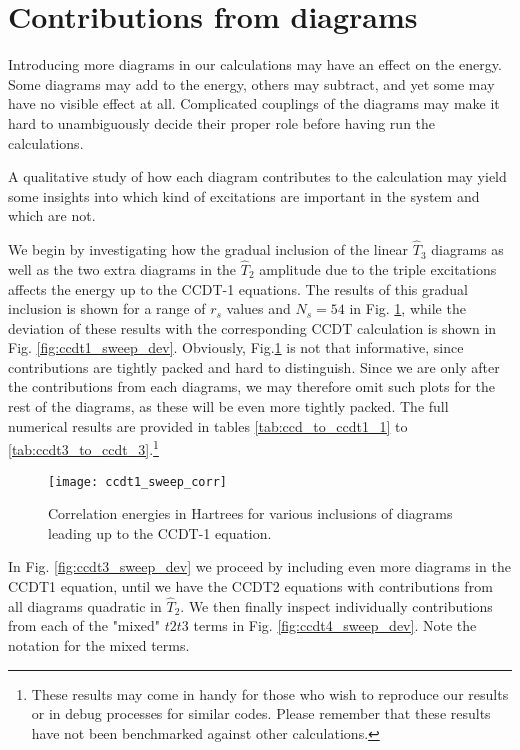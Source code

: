 \FloatBarrier
\section{Contributions from diagrams}

Introducing more diagrams in our calculations may have an effect on
the energy. Some diagrams may add to the energy, others may subtract,
and yet some may have no visible effect at all. Complicated couplings
of the diagrams may make it hard to unambiguously decide their proper role before having run the calculations.

A qualitative study of how each diagram contributes to the calculation
may yield some insights into which kind of excitations are important
in the system and which are not.

We begin by investigating how the gradual inclusion of the linear
$\hat{T}_3$ diagrams as well as the two extra diagrams in the
$\hat{T}_2$ amplitude due to the triple excitations affects the energy
up to the CCDT-1 equations. The results of this gradual inclusion is
shown for a range of $r_s$ values and $N_s = 54$ in
Fig. \ref{fig:ccdt1_sweep_corr}, while the deviation of these results
with the corresponding CCDT calculation is shown in
Fig. \ref{fig:ccdt1_sweep_dev}. Obviously,
Fig.\ref{fig:ccdt1_sweep_corr} is not that informative, since
contributions are tightly packed and hard to distinguish. Since we are
only after the contributions from each diagrams, we may therefore omit
such plots for the rest of the diagrams, as these will be even more
tightly packed. The full numerical results are provided in tables
\ref{tab:ccd_to_ccdt1_1} to \ref{tab:ccdt3_to_ccdt_3}.\footnote{These
  results may come in handy for those who wish to reproduce our
  results or in debug processes for similar codes. Please remember
  that these results have not been benchmarked against other calculations.}


\begin{figure}[!htb]
  \centering
  \texttt{[image: ccdt1\_sweep\_corr]}
  \caption{Correlation energies in Hartrees for various inclusions of diagrams leading up to the CCDT-1 equation.}
\label{fig:ccdt1_sweep_corr}
\end{figure}



In Fig. \ref{fig:ccdt3_sweep_dev} we proceed by including even more
diagrams in the CCDT1 equation, until we have the CCDT2 equations with
contributions from all diagrams quadratic in $\hat{T}_2$. We then
finally inspect individually contributions from each of the "mixed"
$t2t3$ terms in Fig. \ref{fig:ccdt4_sweep_dev}. Note the notation for the mixed terms.

